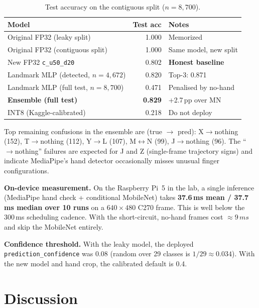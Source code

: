 \documentclass[sigconf,nonacm]{acmart}
\begin{document}
\begin{table}[h]
\caption{Test accuracy on the contiguous split ($n{=}8{,}700$).}
\label{tab:results}
\begin{tabular}{lrl}
\toprule
Model & Test acc & Notes \\
\midrule
Original FP32 (leaky split)          & 1.000 & Memorized \\
Original FP32 (contiguous split)     & 1.000 & Same model, new split \\
New FP32 \texttt{c\_u50\_d20}        & 0.802 & \textbf{Honest baseline} \\
Landmark MLP (detected, $n{=}4{,}672$) & 0.820 & Top-3: 0.871 \\
Landmark MLP (full test, $n{=}8{,}700$) & 0.471 & Penalised by no-hand \\
\textbf{Ensemble (full test)}        & \textbf{0.829} & +2.7\,pp over MN \\
INT8 (Kaggle-calibrated)             & 0.218 & Do not deploy \\
\bottomrule
\end{tabular}
\end{table}

Top remaining confusions in the ensemble are (true $\to$ pred): X$\to$nothing
(152), T$\to$nothing (112), Y$\to$L (107), M$\leftrightarrow$N (99), J$\to$nothing
(96).  The ``$\to$nothing'' failures are expected for J and Z (single-frame
trajectory signs) and indicate MediaPipe's hand detector occasionally
misses unusual finger configurations.

\textbf{On-device measurement.}  On the Raspberry Pi~5 in the lab, a
single inference (MediaPipe hand check + conditional MobileNet) takes
\textbf{37.6\,ms mean / 37.7\,ms median over 10 runs} on a
$640{\times}480$ C270 frame.  This is well below the 300\,ms scheduling
cadence.  With the short-circuit, no-hand frames cost ${\approx}9\,ms$
and skip the MobileNet entirely.

\textbf{Confidence threshold.}  With the leaky model, the deployed
\texttt{prediction\_confidence} was 0.08 (random over 29 classes is
$1/29 \approx 0.034$).  With the new model and hand crop, the calibrated
default is 0.4.

\section{Discussion}
\end{document}
